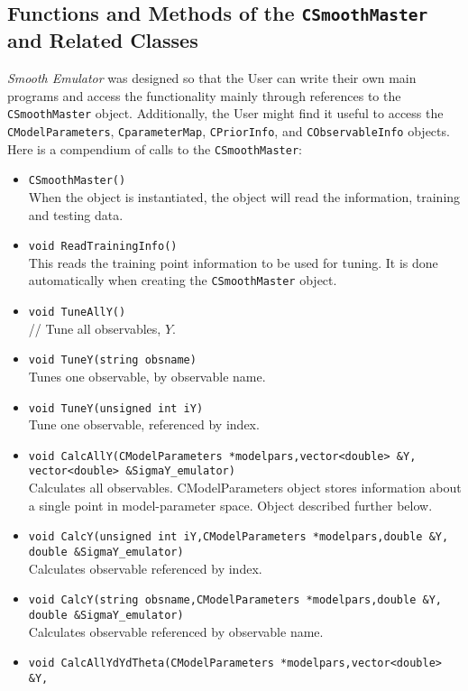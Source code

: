 \documentclass[UserManual.tex]{subfiles}
\begin{document}
\subsection{Functions and Methods of the {\tt CSmoothMaster} and Related Classes}
{\it Smooth Emulator} was designed so that the User can write their own main programs and access the functionality mainly through references to the {\tt CSmoothMaster} object. Additionally, the User might find it useful to access the {\tt CModelParameters}, {\tt CparameterMap}, {\tt CPriorInfo}, and {\tt CObservableInfo} objects. Here is a compendium of calls to the {\tt CSmoothMaster}:
\begin{itemize}\itemsep=0pt
\item {\tt CSmoothMaster()}\\
When the object is instantiated, the object will read the information, training and testing data.
\item {\tt void ReadTrainingInfo()}\\
This reads the training point information to be used for tuning. It is done automatically when creating the {\tt CSmoothMaster} object.
\item {\tt void TuneAllY()}\\ //
Tune all observables, $Y$.
\item {\tt void TuneY(string obsname)}\\
Tunes one observable, by observable name.
\item {\tt void TuneY(unsigned int iY)}\\
Tune one observable, referenced by index.
\item {\tt void CalcAllY(CModelParameters *modelpars,vector<double> \&Y,\\vector<double> \&SigmaY\_emulator)}\\
Calculates all observables. CModelParameters object stores information about a single point in model-parameter space. Object described further below.
\item {\tt void CalcY(unsigned int iY,CModelParameters *modelpars,double \&Y,\\double \&SigmaY\_emulator)}\\
Calculates observable referenced by index.
\item {\tt void CalcY(string obsname,CModelParameters *modelpars,double \&Y,\\double \&SigmaY\_emulator)}\\
Calculates observable referenced by observable name.
\item {\tt void CalcAllYdYdTheta(CModelParameters *modelpars,vector<double> \&Y,\\
}
\end{itemize}
\end{document}
